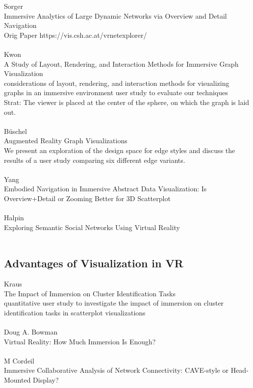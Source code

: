 Sorger\\
Immersive Analytics of Large Dynamic Networks via Overview and Detail Navigation\\
Orig Paper https://vis.csh.ac.at/vrnetexplorer/\\
\\
Kwon\\
A Study of Layout, Rendering, and Interaction Methods for Immersive Graph Visualization\\
considerations of layout, rendering, and interaction methods for visualizing graphs in an  immersive environment user study to evaluate our techniques\\
Strat: The viewer is placed at the center of the sphere, on which the graph is laid out.\\
\\
Büschel\\
Augmented Reality Graph Visualizations\\
We present an exploration of the design space for edge styles and discuss the results of a user study comparing six different edge variants.\\
\\
Yang\\
Embodied Navigation in Immersive Abstract Data Visualization:
Is Overview+Detail or Zooming Better for 3D Scatterplot\\
\\
Halpin\\
Exploring Semantic Social Networks Using Virtual Reality\\
\\

\subsection{Advantages of Visualization in VR}
Kraus\\
The Impact of Immersion on Cluster Identification Tasks\\
quantitative user study to investigate the impact of immersion on cluster identification tasks in scatterplot visualizations\\
\\
Doug A. Bowman\\
Virtual Reality: How Much Immersion Is Enough?\\
\\
M Cordeil\\
Immersive Collaborative Analysis of Network Connectivity: CAVE-style or Head-Mounted Display?\\
\\

